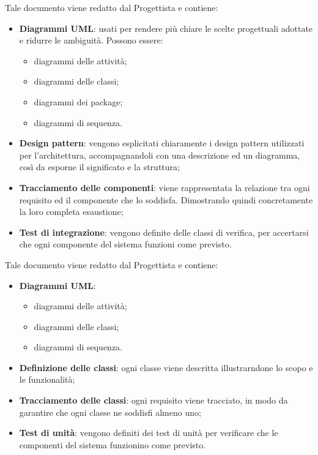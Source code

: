 	     Tale documento viene redatto dal Progettista e contiene:
	     \begin{itemize}
	     	\item{\textbf{Diagrammi UML}: usati per rendere più chiare le scelte progettuali adottate e ridurre le ambiguità. Possono essere:
                    \begin{itemize}
                    	\item{diagrammi delle attività;}
    			\item{diagrammi delle classi;}
    			\item{diagrammi dei package;}    			
			\item{diagrammi di sequenza.}                    
		\end{itemize}
}
		\item{\textbf{Design pattern}: vengono esplicitati chiaramente i design pattern utilizzati per l'architettura, accompagnandoli con una descrizione ed un diagramma, così da esporne il significato e la struttura;}
		\item{\textbf{Tracciamento delle componenti}: viene rappresentata la relazione tra ogni requisito ed il componente che lo soddisfa. Dimostrando quindi concretamente la loro completa esaustione;}
		\item{\textbf{Test di integrazione}: vengono definite delle classi di verifica, per accertarsi che ogni componente del sistema funzioni come previsto.}
	     \end{itemize}
	     
	     Tale documento viene redatto dal Progettista e contiene:
	     \begin{itemize}
	     	\item{\textbf{Diagrammi UML}:
			\begin{itemize}
				\item{diagrammi delle attività;}
    				\item{diagrammi delle classi;}
				\item{diagrammi di sequenza.}
			\end{itemize}
			}
		\item{\textbf{Definizione delle classi}: ogni classe viene descritta illustrarndone lo scopo e le funzionalità;}
		\item{\textbf{Tracciamento delle classi}: ogni requisito viene tracciato, in modo da garantire che ogni classe ne soddisfi almeno uno;}
		\item{\textbf{Test di unità}: vengono definiti dei test di unità per verificare che le componenti del sistema funzionino come previsto.}
	     \end{itemize}
	     

